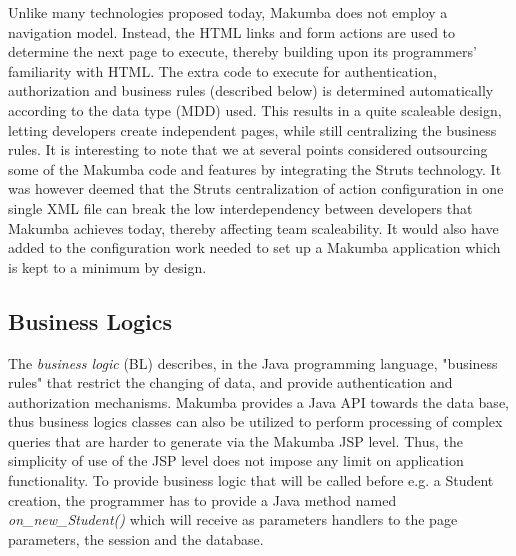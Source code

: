 \documentclass{llncs}
\begin{document}
Unlike many technologies proposed today, Makumba does not employ a navigation model. Instead, the HTML links and form actions are used to determine the next page to execute, thereby building upon its programmers' familiarity with HTML. The extra code to execute for authentication, authorization and business rules (described below) is determined automatically according to the data type (MDD) used. This results in a quite scaleable design, letting developers create independent pages, while still centralizing the business rules. It is interesting to note that we at several points considered outsourcing some of the Makumba code and features by integrating the Struts technology. It was however deemed that the Struts centralization of action configuration in one single XML file can break the low interdependency between developers that Makumba achieves today, thereby affecting team scaleability. It would also have added to the configuration work needed to set up a Makumba application which is kept to a minimum by design.

\subsection{Business Logics}
The \textit{business logic} (BL) describes, in the Java programming language, "business rules" that restrict the changing of data, and provide authentication and authorization mechanisms. Makumba provides a Java API towards the data base, thus business logics classes can also be utilized to perform processing of complex queries that are harder to generate via the Makumba JSP level. Thus, the simplicity of use of the JSP level does not impose any limit on application functionality. To provide business logic that will be called before e.g. a Student creation, the programmer has to provide a Java method named \textit{on\_new\_Student()} which will receive as parameters handlers to the page parameters, the session and the database.

\end{document}
